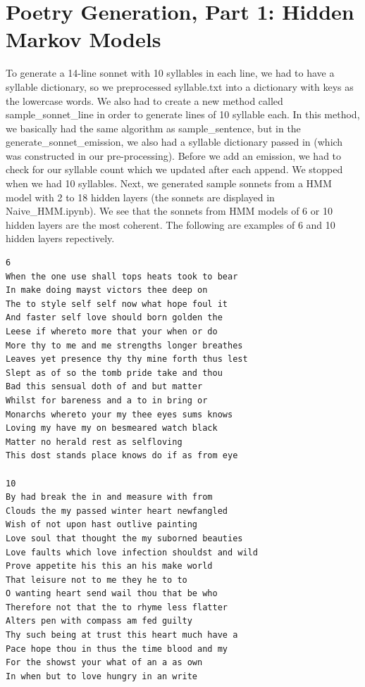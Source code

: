 \section{Poetry Generation, Part 1: Hidden Markov Models}
\medskip
To generate a 14-line sonnet with 10 syllables in each line, we had to have a syllable dictionary, so we preprocessed syllable.txt into a dictionary with keys as the lowercase words. We also had to create a new method called sample_sonnet_line in order to generate lines of 10 syllable each. In this method, we basically had the same algorithm as sample_sentence, but in the generate_sonnet_emission, we also had a syllable dictionary passed in (which was constructed in our pre-processing). Before we add an emission, we had to check for our syllable count which we updated after each append. We stopped when we had 10 syllables. Next, we generated sample sonnets from a HMM model with 2 to 18 hidden layers (the sonnets are displayed in Naive_HMM.ipynb). We see that the sonnets from HMM models of 6 or 10 hidden layers are the most coherent. The following are examples of 6 and 10 hidden layers repectively. 

\begin{verbatim}
6
When the one use shall tops heats took to bear
In make doing mayst victors thee deep on
The to style self self now what hope foul it
And faster self love should born golden the
Leese if whereto more that your when or do
More thy to me and me strengths longer breathes
Leaves yet presence thy thy mine forth thus lest
Slept as of so the tomb pride take and thou
Bad this sensual doth of and but matter
Whilst for bareness and a to in bring or
Monarchs whereto your my thee eyes sums knows
Loving my have my on besmeared watch black
Matter no herald rest as selfloving
This dost stands place knows do if as from eye

10
By had break the in and measure with from
Clouds the my passed winter heart newfangled
Wish of not upon hast outlive painting
Love soul that thought the my suborned beauties
Love faults which love infection shouldst and wild
Prove appetite his this an his make world
That leisure not to me they he to to
O wanting heart send wail thou that be who
Therefore not that the to rhyme less flatter
Alters pen with compass am fed guilty
Thy such being at trust this heart much have a
Pace hope thou in thus the time blood and my
For the showst your what of an a as own
In when but to love hungry in an write
\end{verbatim}

